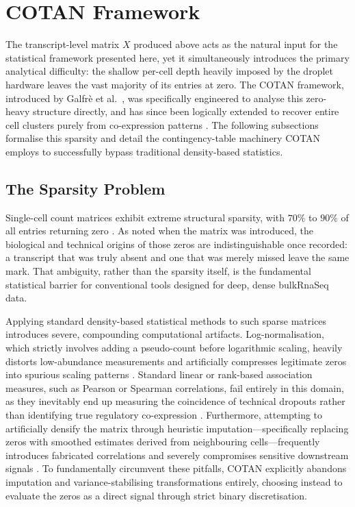 \section{COTAN Framework}\label{sec:cotan-framework}

The transcript-level matrix $X$ produced above acts as the natural input for the statistical framework presented here, yet it simultaneously introduces the primary analytical difficulty: the shallow per-cell depth heavily imposed by the droplet hardware leaves the vast majority of its entries at zero. The COTAN framework, introduced by Galfr\`e et al.\ \cite{galfre2021cotan}, was specifically engineered to analyse this zero-heavy structure directly, and has since been logically extended to recover entire cell clusters purely from co-expression patterns \cite{galfre2026gene}. The following subsections formalise this sparsity and detail the contingency-table machinery COTAN employs to successfully bypass traditional density-based statistics.

\subsection{The Sparsity Problem}

Single-cell count matrices exhibit extreme structural sparsity, with $70\%$ to $90\%$ of all entries returning zero \cite{galfre2021cotan}. As noted when the matrix was introduced, the biological and technical origins of those zeros are indistinguishable once recorded: a transcript that was truly absent and one that was merely missed leave the same mark. That ambiguity, rather than the sparsity itself, is the fundamental statistical barrier for conventional tools designed for deep, dense \gls{bulkRnaSeq} data.

Applying standard density-based statistical methods to such sparse matrices introduces severe, compounding computational artifacts. Log-normalisation, which strictly involves adding a pseudo-count before logarithmic scaling, heavily distorts low-abundance measurements and artificially compresses legitimate zeros into spurious scaling patterns \cite{galfre2021cotan}. Standard linear or rank-based association measures, such as Pearson or Spearman correlations, fail entirely in this domain, as they inevitably end up measuring the coincidence of technical dropouts rather than identifying true regulatory co-expression \cite{galfre2021cotan}. Furthermore, attempting to artificially densify the matrix through heuristic imputation---specifically replacing zeros with smoothed estimates derived from neighbouring cells---frequently introduces fabricated correlations and severely compromises sensitive downstream signals \cite{galfre2021cotan}. To fundamentally circumvent these pitfalls, COTAN explicitly abandons imputation and variance-stabilising transformations entirely, choosing instead to evaluate the zeros as a direct signal through strict binary discretisation.

